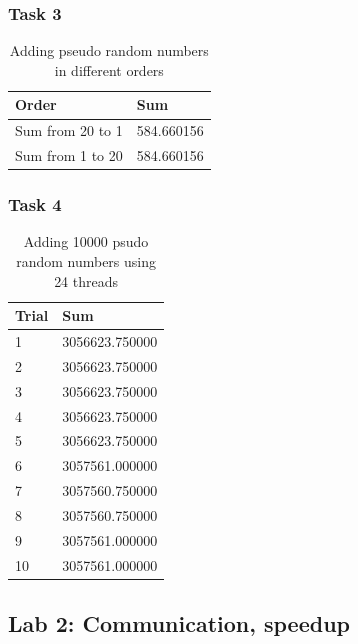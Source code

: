\documentclass[12pt]{article}
\begin{document}
  \subsubsection*{Task 3}
  \begin{table}[H]
    \centering
    \begin{tabular}{|l|l|}
      \hline
      Order            & Sum        \\ \hline
      Sum from 20 to 1 & 584.660156 \\ \hline
      Sum from 1 to 20 & 584.660156 \\ \hline
    \end{tabular}
    \caption{Adding pseudo random numbers in different orders}
    \label{fig:lab2_task3}
  \end{table}

  \subsubsection*{Task 4}
  \begin{table}[H]
    \centering
    \begin{tabular}{|l|l|}
      \hline
      Trial & Sum            \\ \hline
      1     & 3056623.750000 \\ \hline
      2     & 3056623.750000 \\ \hline
      3     & 3056623.750000 \\ \hline
      4     & 3056623.750000 \\ \hline
      5     & 3056623.750000 \\ \hline
      6     & 3057561.000000 \\ \hline
      7     & 3057560.750000 \\ \hline
      8     & 3057560.750000 \\ \hline
      9     & 3057561.000000 \\ \hline
      10    & 3057561.000000 \\ \hline
    \end{tabular}
    \caption{Adding 10000 psudo random numbers using 24 threads}
    \label{fig:lab2_task4}
  \end{table}

\subsection*{Lab 2: Communication, speedup}
  
\end{document}
